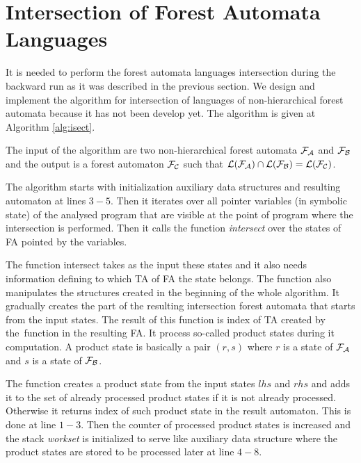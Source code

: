 \section{Intersection of Forest Automata Languages}
\label{sec:isect}
It is needed to perform the forest automata languages intersection
during the backward run as it was described in the previous section.
We design and implement the algorithm for intersection
of languages of non-hierarchical forest automata because it has not been develop yet.
The algorithm is given at Algorithm \ref{alg:isect}.

The input of the algorithm are two non-hierarchical forest automata $\mathcal{F}_{\mathcal{A}}$
and $\mathcal{F}_{\mathcal{B}}$ and the output is a forest automaton $\mathcal{F}_{\mathcal{C}}$ such that
$\mathcal{L}(\mathcal{F}_{\mathcal{A}}) \cap \mathcal{L}(\mathcal{F}_{\mathcal{B}}) = \mathcal{L}(\mathcal{F}_{\mathcal{C}})$.

The algorithm starts with initialization auxiliary data structures and
resulting automaton at lines $3-5$.
Then it iterates over all pointer variables (in symbolic state) of the analysed program
that are visible at the point of program where the intersection is performed.
Then it calls the function \emph{intersect} over the states of FA pointed
by the variables.

The function intersect takes as the input these states and
it also needs information defining to which TA of FA the state belongs.
The function also manipulates the structures created in the beginning of the
whole algorithm.
It gradually creates the part of the resulting intersection forest automata that starts
from the input states.
The result of this function is index of TA created by the~function in the resulting FA.
It process so-called product states during it computation.
A product state is basically a pair $(r,s)$ where $r$ is a state of $\mathcal{F}_{\mathcal{A}}$
and $s$ is a state of $\mathcal{F}_{\mathcal{B}}$.

The function creates a product state from the input states $lhs$ and $rhs$ and
adds it to the set of already processed product states if it is not already processed.
Otherwise it returns index of such product state in the result automaton.
This is done at line $1-3$.
Then the counter of processed product states is increased and
the stack \emph{workset} is initialized to serve like auxiliary data
structure where the product states are stored to be processed later at line $4-8$.

